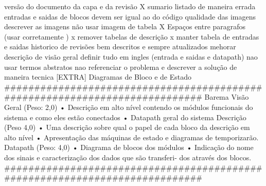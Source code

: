     versão do documento da capa e da revisão
X    sumario listado de maneira errada
    entradas e saidas de blocos devem ser igual ao do código
    qualidade das imagens
    descrever as imagens
    não usar imagem de tabela
X    Espaços entre paragrafos (usar corretamente \newpage)
x    remover tabelas de descrição
x    manter tabela de entradas e saidas
    historico de revisões bem descritos e sempre atualizados
    mehorar descrição de visão geral
    definir tudo em ingles (entrada e saidas e datapath)
    nao usar termos abstratos
    nao referenciar o problema e descrever a solução de maneira tecnica
    [EXTRA] Diagramas de Bloco e de Estado
    ############################################################################
    Barema
    Visão Geral (Peso: 2,0)
        • Descrição em alto nível contendo os módulos funcionais do sistema e
        como eles estão conectados
        • Datapath geral do sistema
    Descrição (Peso 4,0)
        • Uma descrição sobre qual o papel de cada bloco da descrição em alto
        nível
        • Apresentação das máquinas de estado e diagramas de temporizarão.
    Datapath (Peso: 4,0)
    • Diagrama de blocos dos módulos
    • Indicação do nome dos sinais e caracterização dos dados que são transferi-
    dos através dos blocos.
    ############################################################################
